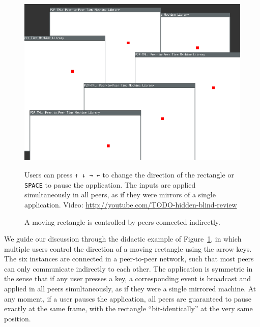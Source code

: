 \documentclass[12pt]{article}
\newcommand{\code}[1]  {\texttt{\small{#1}}}
\begin{document}
\begin{figure}
  \begin{minipage}[c]{0.45\textwidth}
    \includegraphics[width=\textwidth]{move}
  \end{minipage}\hfill
  \begin{minipage}[c]{0.50\textwidth}
        Users can press \code{↑ ↓ → ←} to change the direction of the
        rectangle or \code{SPACE} to pause the application.
        The inputs are applied simultaneously in all peers, as if they were
        mirrors of a single application.
        Video: \url{http://youtube.com/TODO-hidden-blind-review}
  \end{minipage}
    \caption{
        A moving rectangle is controlled by peers connected indirectly.
        \label{fig.move}
    }
\end{figure}

We guide our discussion through the didactic example of Figure~\ref{fig.move},
in which multiple users control the direction of a moving rectangle using the
arrow keys.
The six instances are connected in a peer-to-peer network, such that most
peers can only communicate indirectly to each other.
%
The application is symmetric in the sense that if any user presses a key, a
corresponding event is broadcast and applied in all peers simultaneously, as
if they were a single mirrored machine.
At any moment, if a user pauses the application, all peers are guaranteed to
pause exactly at the same frame, with the rectangle ``bit-identically'' at the
very same position.
\end{document}
